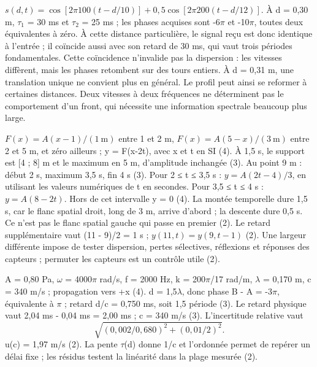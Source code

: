 $s(d,t)=\cos[2\pi100(t-d/10)]+0{,}5\cos[2\pi200(t-d/12)]$. À d = 0,30 m, \ensuremath{\tau_1} = 30 ms et \ensuremath{\tau_2} = 25 ms ; les phases acquises sont -6\ensuremath{\pi} et -10\ensuremath{\pi}, toutes deux équivalentes à zéro. À cette distance particulière, le signal reçu est donc identique à l’entrée ; il coïncide aussi avec son retard de 30 ms, qui vaut trois périodes fondamentales. Cette coïncidence n’invalide pas la dispersion : les vitesses diffèrent, mais les phases retombent sur des tours entiers. À d = 0,31 m, une translation unique ne convient plus en général. Le profil peut ainsi se reformer à certaines distances. Deux vitesses à deux fréquences ne déterminent pas le comportement d’un front, qui nécessite une information spectrale beaucoup plus large.

$F(x)=A(x-1)/(1\ \mathrm m)$ entre 1 et 2 m, $F(x)=A(5-x)/(3\ \mathrm m)$ entre 2 et 5 m, et zéro ailleurs ; y = F(x-2t), avec x et t en SI (4). À 1,5 s, le support est [4 ; 8] m et le maximum en 5 m, d’amplitude inchangée (3).
Au point 9 m : début 2 s, maximum 3,5 s, fin 4 s (3). Pour 2 ≤ t ≤ 3,5 s : $y=A(2t-4)/3$, en utilisant les valeurs numériques de t en secondes. Pour 3,5 ≤ t ≤ 4 s : $y=A(8-2t)$. Hors de cet intervalle y = 0 (4). La montée temporelle dure 1,5 s, car le flanc spatial droit, long de 3 m, arrive d’abord ; la descente dure 0,5 s. Ce n’est pas le flanc spatial gauche qui passe en premier (2).
Le retard supplémentaire vaut (11 - 9)/2 = 1 s ; $y(11,t)=y(9,t-1)$ (2). Une largeur différente impose de tester dispersion, pertes sélectives, réflexions et réponses des capteurs ; permuter les capteurs est un contrôle utile (2).


A = 0,80 Pa, \ensuremath{\omega} = 4000\ensuremath{\pi} rad/s, f = 2000 Hz, k = 200\ensuremath{\pi}/17 rad/m, \ensuremath{\lambda} = 0,170 m, c = 340 m/s ; propagation vers +x (4). d = 1,5\ensuremath{\lambda}, donc phase B - A = -3\ensuremath{\pi}, équivalente à \ensuremath{\pi} ; retard d/c = 0,750 ms, soit 1,5 période (3).
Le retard physique vaut 2,04 ms - 0,04 ms = 2,00 ms ; c = 340 m/s (3). L’incertitude relative vaut \[\sqrt{(0{,}002/0{,}680)^2+(0{,}01/2)^2}.\]u(c) = 1,97 m/s (2). La pente \ensuremath{\tau}(d) donne 1/c et l’ordonnée permet de repérer un délai fixe ; les résidus testent la linéarité dans la plage mesurée (2).


